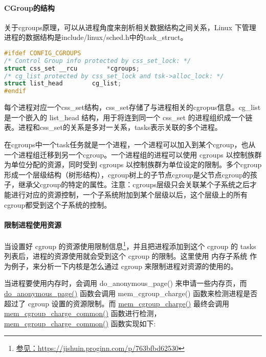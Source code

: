 \documentclass[../../../interview-questions.tex]{subfiles}
\begin{document}
\paragraph{CGroup的结构}

关于cgroups原理，可以从进程角度来剖析相关数据结构之间关系，Linux 下管理进程的数据结构是include/linux/sched.h中的task\_struct。

\begin{lstlisting}[language=C]
#ifdef CONFIG_CGROUPS
/* Control Group info protected by css_set_lock: */
struct css_set __rcu		*cgroups;
/* cg_list protected by css_set_lock and tsk->alloc_lock: */
struct list_head		cg_list;
#endif
\end{lstlisting}

每个进程对应一个css\_set结构，css\_set存储了与进程相关的cgropus信息。cg\_list是一个嵌入的 list\_head 结构，用于将连到同一个 css\_set 的进程组织成一个链表。进程和css\_set的关系是多对一关系，tasks表示关联的多个进程。

在cgroups中一个task任务就是一个进程，一个进程可以加入到某个cgroup，也从一个进程组迁移到另一个cgroup。一个进程组的进程可以使用 cgroups 以控制族群为单位分配的资源，同时受到 cgroups 以控制族群为单位设定的限制。多个cgroup形成一个层级结构（树形结构），cgroup树上的子节点cgroup是父节点cgroup的孩子，继承父cgroup的特定的属性。注意：cgroups层级只会关联某个子系统之后才能进行对应的资源控制，一个子系统附加到某个层级以后，这个层级上的所有cgroup都受到这个子系统的控制。

\paragraph{限制进程使用资源}

当设置好 cgroup 的资源使用限制信息\footnote{\url{参见：https://jishuin.proginn.com/p/763bfbd62530}}，并且把进程添加到这个 cgroup 的 tasks 列表后，进程的资源使用就会受到这个 cgroup 的限制。这里使用 内存子系统 作为例子，来分析一下内核是怎么通过 cgroup 来限制进程对资源的使用的。

当进程要使用内存时，会调用 do\_anonymous\_page() 来申请一些内存页，而 \url{do\_anonymous\_page()} 函数会调用 mem\_cgroup\_charge() 函数来检测进程是否超过了 cgroup 设置的资源限制。而 \url{mem\_cgroup\_charge()} 最终会调用 \url{mem\_cgroup\_charge\_common()} 函数进行检测，\url{mem\_cgroup\_charge\_common()} 函数实现如下:
\end{document}
